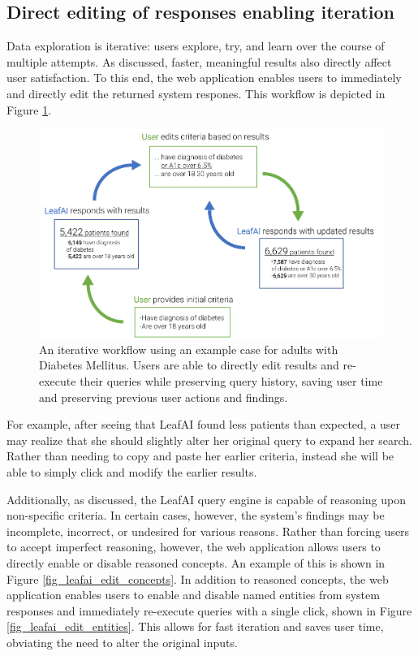 \documentclass[../main.tex]{subfiles}
\begin{document}
\subsection{Direct editing of responses enabling iteration}

Data exploration is iterative: users explore, try, and learn over the course of multiple attempts. As discussed, faster, meaningful results also directly affect user satisfaction. To this end, the web application enables users to immediately and directly edit the returned system respones. This workflow is depicted in Figure \ref{fig_leafai_feedback_loop}. 

\begin{figure}[h!]
  \centering
  \includegraphics[scale=1]{Figures/8_web_application/leafai_feedback_loop.pdf}  
  \caption{An iterative workflow using an example case for adults with Diabetes Mellitus. Users are able to directly edit results and re-execute their queries while preserving query history, saving user time and preserving previous user actions and findings.}
\label{fig_leafai_feedback_loop}
\end{figure}

For example, after seeing that LeafAI found less patients than expected, a user may realize that she should slightly alter her original query to expand her search. Rather than needing to copy and paste her earlier criteria, instead she will be able to simply click and modify the earlier results.

Additionally, as discussed, the LeafAI query engine is capable of reasoning upon non-specific criteria. In certain cases, however, the system's findings may be incomplete, incorrect, or undesired for various reasons. Rather than forcing users to accept imperfect reasoning, however, the web application allows users to directly enable or disable reasoned concepts. An example of this is shown in Figure \ref{fig_leafai_edit_concepts}. In addition to reasoned concepts, the web application enables users to enable and disable named entities from system responses and immediately re-execute queries with a single click, shown in Figure \ref{fig_leafai_edit_entities}. This allows for fast iteration and saves user time, obviating the need to alter the original inputs.
\end{document}
